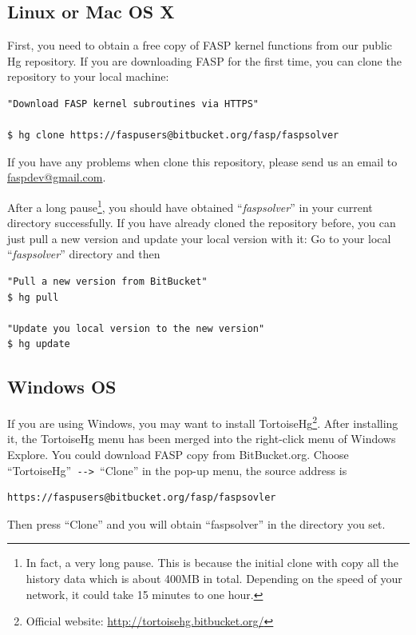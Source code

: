 \documentclass[11pt]{memoir}
\begin{document}
\subsection{Linux or Mac OS X}
First, you need to obtain a free copy of FASP kernel functions from
our public Hg repository. If you are downloading FASP for the first
time, you can clone the repository to your local machine:
%
\begin{lstlisting}[numbers=none]
"Download FASP kernel subroutines via HTTPS"

$ hg clone https://faspusers@bitbucket.org/fasp/faspsolver
\end{lstlisting}
%
\begin{snugshade}\noindent
If you have any problems when clone this repository, please send us an email to \url{faspdev@gmail.com}.
\end{snugshade}

After a long pause\footnote{In fact, a very long pause. This is
  because the initial clone with copy all the history data which is
  about 400MB in total. Depending on the speed of your network, it
  could take 15 minutes to one hour.}, you should have obtained
``\emph{faspsolver}'' in your current directory successfully. If you
have already cloned the repository before, you can just pull a new
version and update your local version with it: Go to your local
``\emph{faspsolver}'' directory and then
%
\begin{lstlisting}[numbers=none]
"Pull a new version from BitBucket"
$ hg pull

"Update you local version to the new version"
$ hg update
\end{lstlisting}
%

\subsection{Windows OS}
If you are using Windows, you may want to install
TortoiseHg\footnote{Official website:
  \url{http://tortoisehg.bitbucket.org/}}. After installing it, the
TortoiseHg menu has been merged into the right-click menu of Windows
Explore. You could download FASP copy from BitBucket.org. Choose
``TortoiseHg''\verb| --> |``Clone'' in the pop-up menu, the source
address is
\begin{lstlisting}[numbers=none]
https://faspusers@bitbucket.org/fasp/faspsovler
\end{lstlisting}
Then press ``Clone'' and you will obtain ``faspsolver'' in the directory you set.
\end{document}
